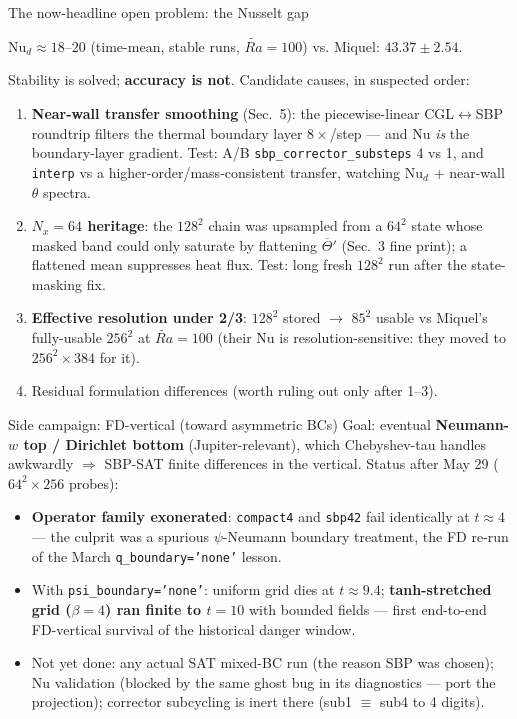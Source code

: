 \documentclass[aspectratio=169,10pt]{beamer}
\newcommand{\Rat}{\widetilde{Ra}}
\newcommand{\Tb}{\overline{\Theta}}
\newcommand{\Nud}{\mathrm{Nu}_{d}}
\begin{document}
\begin{frame}{The now-headline open problem: the Nusselt gap}
  \begin{center}
    $\Nud \approx 18$--$20$ (time-mean, stable runs, $\Rat=100$)
    \quad vs.\quad
    Miquel: $43.37 \pm 2.54$.
  \end{center}
  Stability is solved; \textbf{accuracy is not}. Candidate causes, in suspected order:
  \begin{enumerate}
    \item \textbf{Near-wall transfer smoothing} (Sec.~5): the piecewise-linear
      CGL$\leftrightarrow$SBP roundtrip filters the thermal boundary layer
      $8\times$/step --- and Nu \emph{is} the boundary-layer gradient.
      Test: A/B \texttt{sbp\_corrector\_substeps} 4 vs 1, and \texttt{interp} vs a
      higher-order/mass-consistent transfer, watching $\Nud$ + near-wall
      $\theta$ spectra.
    \item \textbf{$N_x{=}64$ heritage}: the $128^2$ chain was upsampled from a
      $64^2$ state whose masked band could only saturate by flattening
      $\Tb'$ (Sec.~3 fine print); a flattened mean suppresses heat flux.
      Test: long fresh $128^2$ run after the state-masking fix.
    \item \textbf{Effective resolution under 2/3}: $128^2$ stored $\to$ $85^2$
      usable vs Miquel's fully-usable $256^2$ at $\Rat{=}100$
      (their Nu is resolution-sensitive: they moved to $256^2{\times}384$ for it).
    \item Residual formulation differences (worth ruling out only after 1--3).
  \end{enumerate}
\end{frame}

\begin{frame}{Side campaign: FD-vertical (toward asymmetric BCs)}
  Goal: eventual \textbf{Neumann-$w$ top / Dirichlet bottom} (Jupiter-relevant), which
  Chebyshev-tau handles awkwardly $\Rightarrow$ SBP-SAT finite differences in the
  vertical. Status after May 29 ($64^2{\times}256$ probes):
  \begin{itemize}
    \item \textbf{Operator family exonerated}: \texttt{compact4} and \texttt{sbp42}
      fail identically at $t\approx4$ --- the culprit was a spurious
      $\psi$-Neumann boundary treatment, the FD re-run of the March
      \texttt{q\_boundary='none'} lesson.
    \item With \texttt{psi\_boundary='none'}: uniform grid dies at $t\approx9.4$;
      \textbf{tanh-stretched grid ($\beta{=}4$) ran finite to $t=10$} with bounded
      fields --- first end-to-end FD-vertical survival of the historical danger window.
    \item Not yet done: any actual SAT mixed-BC run (the reason SBP was chosen);
      Nu validation (blocked by the same ghost bug in its diagnostics --- port the
      projection); corrector subcycling is inert there (sub1 $\equiv$ sub4 to 4
      digits).
  \end{itemize}
\end{frame}
\end{document}
